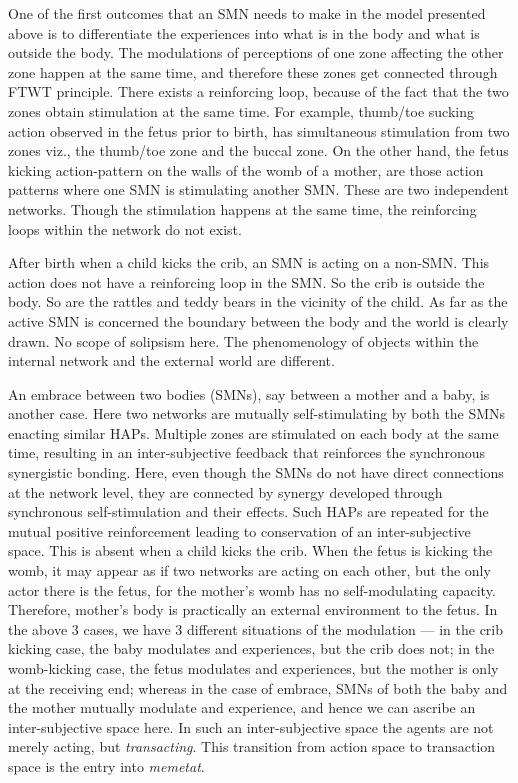One of the first outcomes that an SMN needs to make in the model presented above is to differentiate the experiences into what is in the body and what is outside the body. 
The modulations of perceptions of one zone affecting the other zone happen at the same time, and therefore these zones get connected through FTWT principle. 
There exists a reinforcing loop, because of the fact that the two zones obtain stimulation at the same time. For example, thumb/toe sucking action observed in the fetus prior to birth, has simultaneous stimulation from two zones viz., the thumb/toe zone and the buccal zone. 
On the other hand, the fetus kicking action-pattern on the walls of the womb of a mother, are those action patterns where one SMN is stimulating another SMN. These are two independent networks. 
Though the stimulation happens at the same time, the reinforcing loops within the network do not exist. 

After birth when a child kicks the crib, an SMN is acting on a non-SMN. This action does not have a reinforcing loop in the SMN. So the crib is outside the body. So are the rattles and teddy bears in the vicinity of the child. 
As far as the active SMN is concerned the boundary between the body and the world is clearly drawn. No scope of solipsism here. The phenomenology of objects within the internal network and the external world are different. 

An embrace between two bodies (SMNs), say between a mother and a baby, is another case. Here two networks are mutually self-stimulating by both the SMNs enacting similar HAPs. Multiple zones are stimulated on each body at the same time, resulting in an inter-subjective feedback that reinforces the synchronous synergistic bonding. Here, even though the SMNs do not have direct connections at the network level, they are connected by synergy developed through synchronous self-stimulation and their effects. Such HAPs are repeated for the mutual positive reinforcement leading to conservation of an inter-subjective space. This is absent when a child kicks the crib. When the fetus is kicking the womb, it may appear as if two networks are acting on each other, but the only actor there is the fetus, for the mother's womb has no self-modulating capacity. Therefore, mother's body is practically an external environment to the fetus. In the above 3 cases, we have 3 different situations of the modulation --- in the crib kicking case, the baby modulates and experiences, but the crib does not; in the womb-kicking case, the fetus modulates and experiences, but the mother is only at the receiving end; whereas in the case of embrace, SMNs of both the baby and the mother mutually modulate and experience, and hence we can ascribe an inter-subjective space here.  In such an inter-subjective space the agents are not merely acting, but \textit{transacting}. This transition from action space to transaction space is the entry into \textit{memetat}. 

